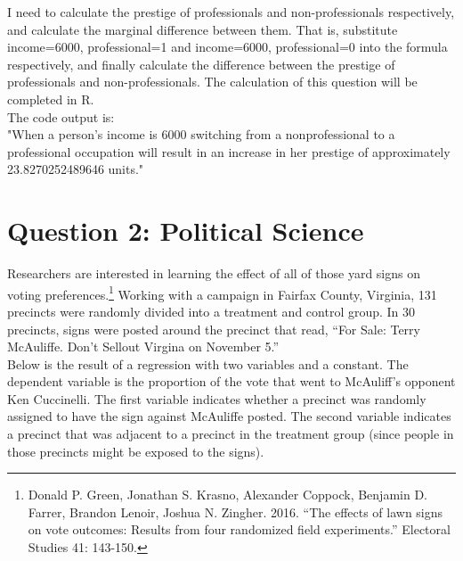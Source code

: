 \documentclass[12pt,letterpaper]{article}
\begin{document}
\begin{enumerate}
	I need to calculate the prestige of professionals and non-professionals respectively, and calculate the marginal difference between them. That is, substitute income=6000, professional=1 and income=6000, professional=0 into the formula respectively, and finally calculate the difference between the prestige of professionals and non-professionals. The calculation of this question will be completed in R.\\
	
	
	
	The code output is:\\
	
	"When a person's income is 6000 switching from a nonprofessional to a professional occupation will result in an increase in her prestige of approximately 23.8270252489646 units."
\end{enumerate}

\newpage

\section*{Question 2: Political Science}
\vspace{.25cm}
\noindent 	Researchers are interested in learning the effect of all of those yard signs on voting preferences.\footnote{Donald P. Green, Jonathan	S. Krasno, Alexander Coppock, Benjamin D. Farrer,	Brandon Lenoir, Joshua N. Zingher. 2016. ``The effects of lawn signs on vote outcomes: Results from four randomized field experiments.'' Electoral Studies 41: 143-150. } Working with a campaign in Fairfax County, Virginia, 131 precincts were randomly divided into a treatment and control group. In 30 precincts, signs were posted around the precinct that read, ``For Sale: Terry McAuliffe. Don't Sellout Virgina on November 5.'' \\

Below is the result of a regression with two variables and a constant.  The dependent variable is the proportion of the vote that went to McAuliff's opponent Ken Cuccinelli. The first variable indicates whether a precinct was randomly assigned to have the sign against McAuliffe posted. The second variable indicates
a precinct that was adjacent to a precinct in the treatment group (since people in those precincts might be exposed to the signs).  \\
\end{document}
